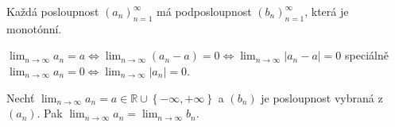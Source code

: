 \begin{theorem}
	Každá posloupnost $(a_n)_{n=1}^{\infty}$ má podposloupnost $(b_n)_{n=1}^{\infty}$, která je monotónní.
	\label{thm:bolzano_weierstrass}
\end{theorem}

\begin{theorem}[(EDL)]
	$\lim_{n \rightarrow \infty} a_n = a \Leftrightarrow \lim_{n \rightarrow \infty}(a_n - a) = 0 \Leftrightarrow \lim_{n \rightarrow \infty}|a_n - a| = 0$
	speciálně $\lim_{n \rightarrow \infty} a_n = 0 \Leftrightarrow \lim_{n \rightarrow \infty} |a_n| = 0$.
	\label{thm:edl}
\end{theorem}

\begin{theorem}
	Nechť $\lim_{n \rightarrow \infty} a_n = a \in \mathbb{R} \cup \left\{ -\infty, +\infty \right\}$ a $(b_n)$ je posloupnost vybraná z $(a_n)$.
	Pak $\lim_{n \rightarrow \infty} a_n = \lim_{n \rightarrow \infty} b_n$.
	\label{thm:veta_o_vybrane_posloupnosti}
\end{theorem}

